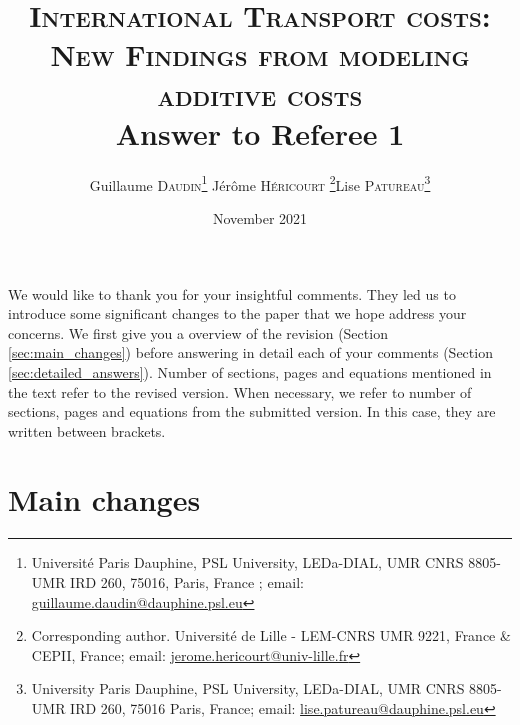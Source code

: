\documentclass[a4paper,11pt]{article}
\begin{document}
\title{\textsc{International Transport costs:\\New Findings from modeling additive costs} \\
Answer to Referee 1}

\author{Guillaume \textsc{Daudin}\thanks{%
Université Paris Dauphine, PSL University, LEDa-DIAL, UMR CNRS 8805-UMR IRD 260, 75016, Paris, France ; email: \url{guillaume.daudin@dauphine.psl.eu}}  \qquad J\'{e}r\^{o}me \textsc{H\'{e}ricourt} \thanks{Corresponding author. Universit\'{e} de Lille - LEM-CNRS UMR 9221, France \& CEPII, France; email: \url{jerome.hericourt@univ-lille.fr}}\qquad Lise \textsc{Patureau}\thanks{
University Paris Dauphine, PSL University, LEDa-DIAL, UMR CNRS 8805-UMR IRD 260, 75016 Paris, France;  email: \url{lise.patureau@dauphine.psl.eu} } }


\date{November 2021}
 \maketitle
\bigskip

We would like to thank you for your insightful comments. They led us to introduce some
significant changes to the paper that we hope address your concerns. We first give you a overview
of the revision (Section \ref{sec:main_changes}) before answering in detail each of your comments (Section \ref{sec:detailed_answers}). Number of sections, pages and equations mentioned in the text refer to the revised version. When necessary, we refer to number of sections, pages and equations from the submitted version. In this case, they are written between brackets.

\section{Main changes \label{sec:main_changes}}
\end{document}
